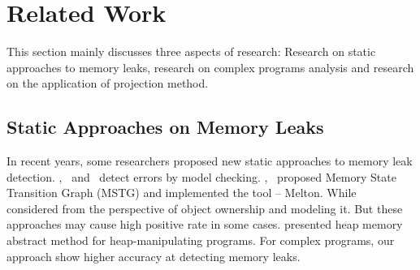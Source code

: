 \section{Related Work}\label{sec:related}
This section mainly discusses three aspects of research: Research on static approaches to memory leaks, research on complex programs analysis and research on the application of projection method.
\subsection{Static Approaches on Memory Leaks}

In recent years, some researchers proposed new static approaches to memory leak detection. \cite{XZX11},~\cite{XZX15} and~\cite{HL06} detect errors by model checking. \cite{XZX11},~\cite{XZX15} proposed Memory State Transition Graph (MSTG) and implemented the tool -- Melton. While ~\cite{HL06} considered from the perspective of object ownership and modeling it. But these approaches may cause high positive rate in some cases. \cite{DWC12} presented heap memory abstract method for heap-manipulating programs. For complex programs, our approach show higher accuracy at detecting memory leaks.   

